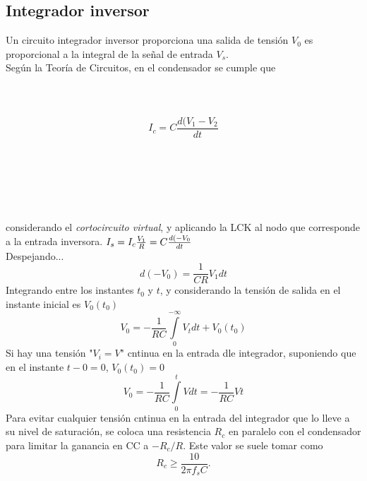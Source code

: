 \documentclass[12pt,spanish,lettersize]{article}
\begin{document}
\subsection{Integrador inversor}
Un circuito integrador inversor proporciona una salida de tensi\'on $V_{0}$ es proporcional a la integral de la se\~nal de entrada $V_{s}$.\\
Seg\'un la Teor\'ia de Circuitos, en el condensador se cumple que\\
\\ \\ \\
\begin{equation}
I_{c} = C\frac{d(V_{1}-V_{2}}{dt}
\end{equation}
\\ \\ \\ \\ \\ \\
considerando el \emph{cortocircuito virtual}, y aplicando la LCK al nodo que corresponde a la entrada inversora.
\begin{math}
I_{s}=I_{c}\\
\frac{V_{1}}{R}=C\frac{d(-V_{0}}{dt}\\
\end{math}\\
Despejando...\\
\begin{equation}
d(-V_{0}) = \frac{1}{CR}V_{1}dt
\end{equation}
Integrando entre los instantes $t_{0}$ y $t$, y considerando la tensi\'on de salida en el instante inicial es $V_{0}(t_{0})$
\begin{equation}
V_{0}=-\frac{1}{RC}\int\limits_{0}^{-\infty}V_{t}dt+V_{0}(t_{0})
\end{equation}
Si hay una tensi\'on "$V_{i}=V$" cntinua en la entrada dle integrador, suponiendo que en el instante $t-{0}=0$, $V_{0}(t_{0})=0$
\begin{equation}
V_{0}=-\frac{1}{RC}\int\limits_{0}^{t}Vdt = -\frac{1}{RC}Vt
\end{equation}
Para evitar cualquier tensi\'on cntinua en la entrada del integrador que lo lleve a su nivel de saturaci\'on, se coloca una resistencia $R_{c}$ en paralelo con el condensador para limitar la ganancia en CC a $-R_{c}/R$. Este valor se suele tomar como 
\begin{equation}
R_{c}\geq\frac{10}{2\pi f_{s}C}.
\end{equation}
\end{document}

